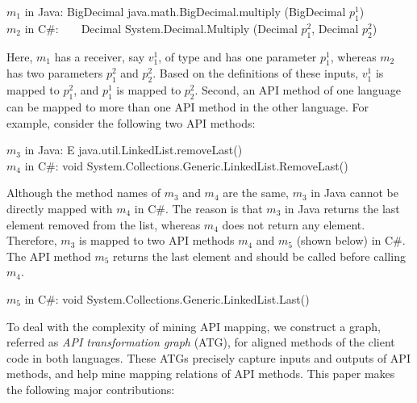 \begin{CodeOut}
$m_1$ in Java: BigDecimal java.math.BigDecimal.multiply (BigDecimal $p_1^1$)\\
\hspace*{0.12in}$m_2$ in C\#:\ \ \ \  Decimal
System.Decimal.Multiply (Decimal $p_1^2$, Decimal $p_2^2$)
\end{CodeOut}

Here, $m_1$ has a receiver, say $v_1^1$, of type 
and has one parameter $p_1^1$, whereas $m_2$ has two parameters $p_1^2$
and $p_2^2$. Based on the definitions of these inputs, $v_1^1$ is
mapped to $p_1^2$, and $p_1^1$ is mapped to $p_2^2$. Second, an API
method of one language can be mapped to more than one API method in the
other language. For example, consider the following two API methods:

\begin{CodeOut}
$m_3$ in Java: E java.util.LinkedList.removeLast()\\
\hspace*{0.12in}$m_4$ in C\#: void System.Collections.Generic.LinkedList.RemoveLast()
\end{CodeOut}

Although the method names of $m_3$ and $m_4$ are the same, $m_3$ in Java
cannot be directly mapped with $m_4$ in C\#. The reason is that $m_3$ in Java
returns the last element removed from the list, whereas $m_4$ does not return any
element. Therefore, $m_3$ is mapped to two API methods $m_4$ and $m_5$ (shown below) in C\#.
The API method $m_5$ returns the last element and should be called before calling $m_4$.

\begin{CodeOut}
$m_5$ in C\#: void System.Collections.Generic.LinkedList.Last()
\end{CodeOut}

To deal with the complexity of mining API mapping, we construct a
graph, referred as \emph{API transformation graph} (ATG), for
aligned methods of the client code in both languages. These ATGs
precisely capture inputs and outputs of API methods, and help mine
mapping relations of API methods. This paper makes the following major
contributions:

